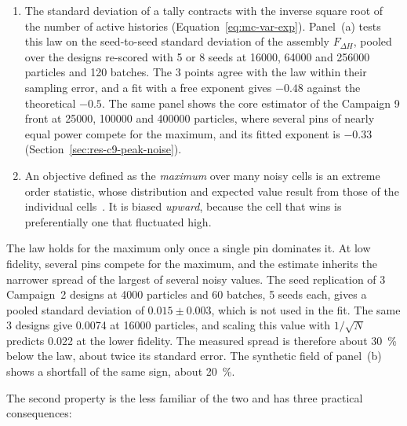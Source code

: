 \begin{enumerate}
  \item The standard deviation of a tally contracts with the inverse
        square root of the number of active histories
        (Equation~\eqref{eq:mc-var-exp}). Panel~(a) tests this law
        on the seed-to-seed standard deviation of the assembly
        $F_{\Delta H}$, pooled over the designs re-scored with 5 or 8 seeds at \num{16000}, \num{64000} and \num{256000}
        particles and 120 batches. The 3 points agree with the law within
        their sampling error, and a fit with a free exponent gives
        $-0.48$ against the theoretical $-0.5$. The same panel shows
        the core estimator of the Campaign 9 front at \num{25000},
        \num{100000} and \num{400000} particles, where several pins of
        nearly equal power compete for the maximum, and its fitted
        exponent is $-0.33$ (Section~\ref{sec:res-c9-peak-noise}).

  \item An objective defined as the \emph{maximum} over many noisy
        cells is an extreme order statistic, whose distribution and
        expected value result from those of the individual
        cells~\cite{david_nagaraja_2003}. It is biased \emph{upward},
        because the cell that wins is preferentially one that
        fluctuated high.
\end{enumerate}

The law holds for the maximum only once a single pin dominates it. At
low fidelity, several pins compete for the maximum, and the estimate
inherits the narrower spread of the largest of several noisy values.
The seed replication of 3 Campaign~2 designs at \num{4000} particles
and 60 batches, 5 seeds each, gives a pooled standard deviation of
$0.015 \pm 0.003$, which is not used in the fit. The same 3 designs
give 0.0074 at \num{16000} particles, and scaling this value with
$1/\sqrt{N}$ predicts 0.022 at the lower fidelity. The measured spread is
therefore about \SI{30}{\percent} below the law, about twice its
standard error. The synthetic field of panel~(b) shows a shortfall of
the same sign, about \SI{20}{\percent}.

The second property is the less familiar of the two and has three
practical consequences:


